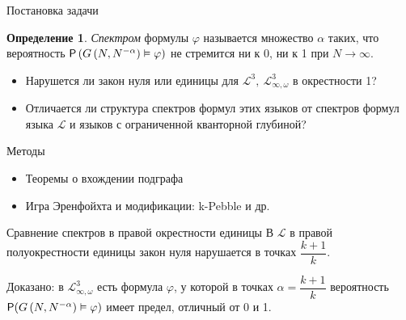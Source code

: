 \documentclass[aspectratio=169,hyperref={unicode},notheorems]{beamer}
\theoremstyle{definition}
\newtheorem {definition}{Определение}
\def \LL     {\mathcal{L}}
\def \Q    {\mathbb {Q}}
\def \P {{\sf P}}
\def \Gna {G\left(N,N^{-\alpha}\right)}
\begin{document}
\begin{frame}{Постановка задачи}
\begin{definition}
    \textit{Спектром} формулы $\varphi$ называется множество $\alpha$ таких, что вероятность $\P\left( G\left(N, N^{-\alpha}\right) \vDash \varphi  \right)$ не стремится ни к 0, ни к 1 при $N \rightarrow \infty$.
\end{definition}
\vspace{0.5 cm}
    \begin{itemize}
        \item Нарушется ли закон нуля или единицы для $\LL^3,~ \LL^3_{\infty, \omega}$ в окрестности 1?
        \item Отличается ли структура спектров формул этих языков от спектров формул языка $\LL$ и языков с ограниченной кванторной глубиной?
    \end{itemize}
\end{frame}

\begin{frame}{Методы}
\begin{itemize}
    \item Теоремы о вхождении подграфа
    \item Игра Эренфойхта и модификации: k-Pebble и др.
\end{itemize}
\end{frame}

\begin{frame}{Сравнение спектров в правой окрестности единицы }
\vspace{0.5 cm}
В $\LL$ в правой полуокрестности единицы закон нуля нарушается в точках $\dfrac{k+1}{k}$.
\vspace{0.5 cm}

Доказано: в $\LL^3_{\infty, \omega}$ есть формула $\varphi$, у которой в точках $\alpha = \dfrac{k+1}{k}$ вероятность $\P(\Gna \vDash \varphi)$ имеет предел, отличный от 0 и 1.
\end{frame}



\end{document}
